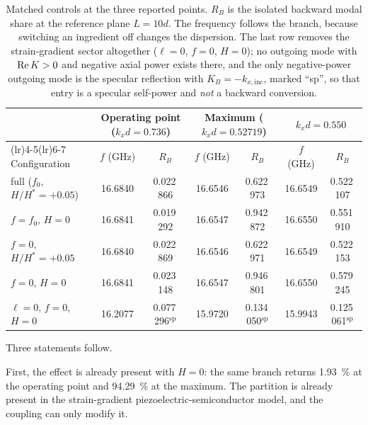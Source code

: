\begin{table}[t]
\centering
\caption{Matched controls at the three reported points.  $R_B$ is the isolated
backward modal share at the reference plane $L=10d$.  The frequency follows the
branch, because switching an ingredient off changes the dispersion.  The last
row removes the strain-gradient sector altogether ($\ell=0$, $f=0$, $H=0$); no
outgoing mode with $\operatorname{Re} K>0$ and negative axial power exists there, and the
only negative-power outgoing mode is the specular reflection with
$K_B=-k_{x,\text{inc}}$, marked ``sp'', so that entry is a specular self-power
and \emph{not} a backward conversion.}
\label{tab:controls}
\small
\begin{tabularx}{\textwidth}{@{}>{\raggedright\arraybackslash}Xcccccc@{}}
\toprule
 & \multicolumn{2}{c}{Operating point ($k_xd=0.736$)}
 & \multicolumn{2}{c}{Maximum ($k_xd=0.52719$)}
 & \multicolumn{2}{c}{$k_xd=0.550$} \\
\cmidrule(lr){2-3}\cmidrule(lr){4-5}\cmidrule(lr){6-7}
Configuration & $f$ (GHz) & $R_B$ & $f$ (GHz) & $R_B$ & $f$ (GHz) & $R_B$ \\
\midrule
full ($f_0$, $H/H^{*}=+0.05$) & 16.6840 & 0.022\,866 & 16.6546 & 0.622\,973 & 16.6549 & 0.522\,107 \\
$f=f_0$, $H=0$                & 16.6841 & 0.019\,292 & 16.6547 & 0.942\,872 & 16.6550 & 0.551\,910 \\
$f=0$, $H/H^{*}=+0.05$        & 16.6840 & 0.022\,869 & 16.6546 & 0.622\,971 & 16.6549 & 0.522\,153 \\
$f=0$, $H=0$                  & 16.6841 & 0.023\,148 & 16.6547 & 0.946\,801 & 16.6550 & 0.579\,245 \\
$\ell=0$, $f=0$, $H=0$        & 16.2077 & 0.077\,296$^{\mathrm{sp}}$
                              & 15.9720 & 0.134\,050$^{\mathrm{sp}}$
                              & 15.9943 & 0.125\,061$^{\mathrm{sp}}$ \\
\bottomrule
\end{tabularx}
\end{table}

Three statements follow.

First, the effect is already present with $H=0$: the same branch returns
\SI{1.93}{\percent} at the operating point and \SI{94.29}{\percent} at the
maximum.  The partition is already present in the strain-gradient
piezoelectric-semiconductor model, and the coupling can only modify it.

